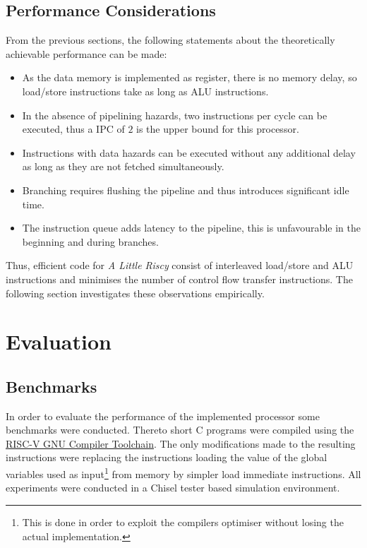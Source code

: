 \documentclass[conference]{IEEEtran}
\begin{document}
\subsection{Performance Considerations} \label{sec:performance}
From the previous sections, the following statements about the theoretically achievable performance can be made:
\begin{itemize}
	\item As the data memory is implemented as register, there is no memory delay, so load/store instructions take as long as ALU instructions.
	\item In the absence of pipelining hazards, two instructions per cycle can be executed, thus a IPC of $2$ is the upper bound for this processor.
	\item Instructions with data hazards can be executed without any additional delay as long as they are not fetched simultaneously.
	\item Branching requires flushing the pipeline and thus introduces significant idle time.
	\item The instruction queue adds latency to the pipeline, this is unfavourable in the beginning and during branches.
\end{itemize}

Thus, efficient code for \emph{A Little Riscy} consist of interleaved load/store and ALU instructions and minimises the number of control flow transfer instructions. The following section investigates these observations empirically.

\section{Evaluation} \label{sec:eval}

\subsection{Benchmarks}

In order to evaluate the performance of the implemented processor some benchmarks were conducted. Thereto short C programs were compiled using the \href{https://github.com/riscv/riscv-gnu-toolchain}{RISC-V GNU Compiler Toolchain}. The only modifications made to the resulting instructions were replacing the instructions loading the value of the global variables used as input\footnote{This is done in order to exploit the compilers optimiser without losing the actual implementation.} from memory by simpler load immediate instructions. All experiments were conducted in a Chisel tester based simulation environment.
 
\end{document}
